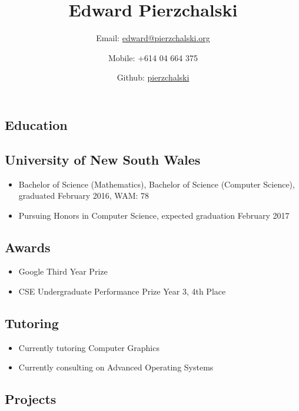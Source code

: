 \documentclass{article}
\title{Edward Pierzchalski}
\author{
  Email: \href{mailto:edward@pierzchalski.org}{edward@pierzchalski.org} 
  \and Mobile: +614 04 664 375
  \and Github: \href{https://github.com/pierzchalski}{pierzchalski}}
\date{}
\begin{document}
\maketitle
\vspace{-1cm}

\begin{multicols*}{2}

\section*{Education}

\subsection*{University of New South Wales}
\begin{itemize}[leftmargin=12pt, itemsep=-2pt]
 \item {Bachelor of Science (Mathematics), Bachelor of Science (Computer Science), graduated February 2016, WAM: 78 }
 \item {Pursuing Honors in Computer Science, expected graduation February 2017}
\end{itemize}

\subsection*{Awards}

\begin{itemize}[leftmargin=12pt, itemsep=-2pt]
 \item {Google Third Year Prize}
 \item {CSE Undergraduate Performance Prize Year 3, 4th Place}
\end{itemize}

\subsection*{Tutoring}

\begin{itemize}[leftmargin=12pt, itemsep=-2pt]
 \item {Currently tutoring Computer Graphics}
 \item {Currently consulting on Advanced Operating Systems}
\end{itemize}

\subsection*{Projects}


\end{multicols*}
\end{document}
